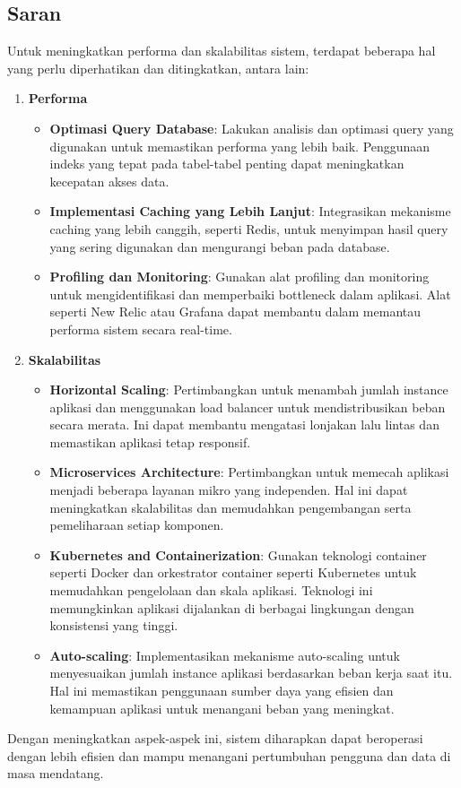 \subsection{Saran}
Untuk meningkatkan performa dan skalabilitas sistem, terdapat beberapa hal yang perlu diperhatikan dan ditingkatkan, antara lain:
\begin{enumerate}
  \item \textbf{Performa} \newline
  \begin{itemize}
    \item \textbf{Optimasi Query Database}: Lakukan analisis dan optimasi query yang digunakan untuk memastikan performa yang lebih baik. Penggunaan indeks yang tepat pada tabel-tabel penting dapat meningkatkan kecepatan akses data.
    \item \textbf{Implementasi Caching yang Lebih Lanjut}: Integrasikan mekanisme caching yang lebih canggih, seperti Redis, untuk menyimpan hasil query yang sering digunakan dan mengurangi beban pada database.
    \item \textbf{Profiling dan Monitoring}: Gunakan alat profiling dan monitoring untuk mengidentifikasi dan memperbaiki bottleneck dalam aplikasi. Alat seperti New Relic atau Grafana dapat membantu dalam memantau performa sistem secara real-time.
  \end{itemize}
  \item \textbf{Skalabilitas} \newline
  \begin{itemize}
    \item \textbf{Horizontal Scaling}: Pertimbangkan untuk menambah jumlah instance aplikasi dan menggunakan load balancer untuk mendistribusikan beban secara merata. Ini dapat membantu mengatasi lonjakan lalu lintas dan memastikan aplikasi tetap responsif.
    \item \textbf{Microservices Architecture}: Pertimbangkan untuk memecah aplikasi menjadi beberapa layanan mikro yang independen. Hal ini dapat meningkatkan skalabilitas dan memudahkan pengembangan serta pemeliharaan setiap komponen.
    \item \textbf{Kubernetes and Containerization}: Gunakan teknologi container seperti Docker dan orkestrator container seperti Kubernetes untuk memudahkan pengelolaan dan skala aplikasi. Teknologi ini memungkinkan aplikasi dijalankan di berbagai lingkungan dengan konsistensi yang tinggi.
    \item \textbf{Auto-scaling}: Implementasikan mekanisme auto-scaling untuk menyesuaikan jumlah instance aplikasi berdasarkan beban kerja saat itu. Hal ini memastikan penggunaan sumber daya yang efisien dan kemampuan aplikasi untuk menangani beban yang meningkat.
  \end{itemize}
\end{enumerate}
Dengan meningkatkan aspek-aspek ini, sistem diharapkan dapat beroperasi dengan lebih efisien dan mampu menangani pertumbuhan pengguna dan data di masa mendatang.

